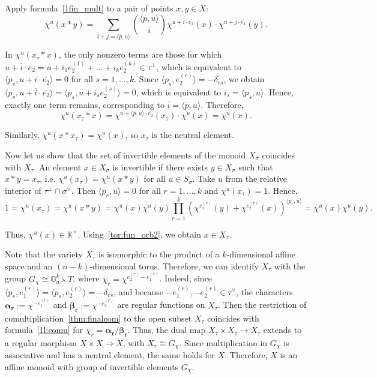 \documentclass[a4paper, 11pt]{amsart}
\theoremstyle{plain}
\theoremstyle{remark}
\theoremstyle{definition}
\newcommand{\KK}{\mathbb{K}}
\newcommand{\G}{\mathbb{G}}
\newcommand{\GG}{G_{\overline{\chi}}}
\newcommand{\ol}[1]{\overline{#1}}
\newcommand{\Alp}[1]{\pmb{\alpha_{#1}}}
\newcommand{\Bet}[1]{\pmb{\beta_{#1}}}
\begin{document}
Apply formula~\eqref{1fin_mult} to a pair of points $x, y \in X$:
\begin{equation}
	\chi^u (x * y) = \sum \limits_{\ol{i} + \ol{j} = \langle \ol{p}, u \rangle } { \langle \ol{p}, u \rangle \choose \ol{i} } \chi^{u + \ol{i}\cdot \ol{e_2}}(x) \cdot  \chi^{u + \ol{j}\cdot \ol{e_1}} (y).
\end{equation}

In $\chi^u (x_\tau * x)$, the only nonzero terms are those for which $u + \ol{i}\cdot \ol{e_2} = u + i_1 e_2^{(1)} + \ldots + i_k e_2^{(k)} \in \tau^\perp$, which is equivalent to $\langle p_s, u + \ol{i}\cdot \ol{e_2} \rangle = 0$ for all $s = 1, \ldots, k$. Since $\langle p_s, e_2^{(r)}\rangle = -\delta_{rs}$, we obtain $\langle p_s, u + \ol{i}\cdot \ol{e_2} \rangle = \langle p_s, u + i_s e_2^{(s)} \rangle = 0$, which is equivalent to $i_s = \langle p_s, u \rangle$. Hence, exactly one term remains, corresponding to $\ol{i} = \langle \ol{p}, u \rangle$. Therefore,
\begin{equation}
	\chi^u (x_\tau * x) =  \chi^{u + \langle \ol{p}, u \rangle\cdot \ol{e_2}}(x_\tau) \cdot  \chi^{u}(x) =  \chi^{u} (x).
\end{equation}

Similarly, $\chi^u (x * x_\tau) = \chi^{u} (x)$, so $x_\tau$ is the neutral element. 

Now let us show that the set of invertible elements of the monoid $X_\sigma$ coincides with $X_\tau$. An element $x \in X_\sigma$ is invertible if there exists $y \in X_\sigma$ such that $x * y = x_\tau$, i.e. $\chi^u (x_\tau) =  \chi^u (x * y)$ for all $u \in S_\sigma$. Take $u$ from the relative interior of $\tau^\perp \cap \sigma^\vee$. Then $\langle p_r, u \rangle = 0$ for all $r = 1, \ldots, k$ and $\chi^u(x_\tau) = 1$. Hence,
\begin{equation}
	1 = \chi^u (x_\tau) =  \chi^u (x * y) = \chi^u (x)  \chi^u (y)  \prod_{r = 1}^{k} (\chi^{e_1^{(r)}}(y) + \chi^{e_2^{(r)}} (x))^{\langle p_r, u\rangle} = \chi^u (x)  \chi^u (y).
\end{equation}

Thus, $\chi^u(x) \in \KK^\times$. Using~\eqref{tor:fun_orb2}, we obtain $x \in X_\tau$.

Note that the variety $X_\tau$ is isomorphic to the product of a $k$-dimensional affine space and an $(n-k)$-dimensional torus. Therefore, we can identify $X_\tau$ with the group $\GG \cong \G_a^k \leftthreetimes T$, where $\chi_r = \chi^{e_2^{(r)} - e_1^{(r)}}$. Indeed, since $\langle p_s, e_1^{(r)} \rangle = \langle p_s, e_2^{(r)} \rangle = -\delta_{rs}$, and because $- e_1^{(r)}, - e_2^{(r)} \in \tau^\vee$, the characters $\Alp{r} := \chi^{- e_1^{(r)}}$ and $\Bet{r} := \chi^{- e_2^{(r)}}$ are regular functions on $X_\tau$. Then the restriction of comultiplication~\eqref{thm:finalcom} to the open subset $X_\tau$ coincides with formula~\eqref{1l:comu} for $\chi_r = \Alp{r}/\Bet{r}$. Thus, the dual map $X_\tau \times X_\tau \to X_\tau$ extends to a regular morphism $X \times X \to X$, with $X_\tau \cong \GG$. Since multiplication in $\GG$ is associative and has a neutral element, the same holds for $X$. Therefore, $X$ is an affine monoid with group of invertible elements $\GG$.
\end{document}
